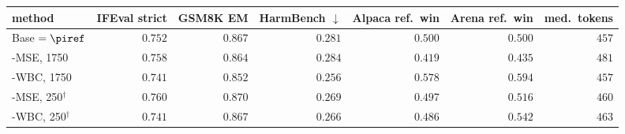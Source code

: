 \begin{tabular}{lrrrrrr}
\toprule
method & IFEval strict & \textsc{GSM8K} EM & HarmBench $\downarrow$ & Alpaca ref.\ win & Arena ref.\ win & med.\ tokens\\
\midrule
Base $=\piref$ & $0.752$ & $0.867$ & $0.281$ & $0.500$ & $0.500$ & $457$\\
\NBPO{}-MSE, 1750 & $0.758$ & $0.864$ & $0.284$ & $0.419$ & $0.435$ & $481$\\
\NBPO{}-WBC, 1750 & $0.741$ & $0.852$ & $0.256$ & $0.578$ & $0.594$ & $457$\\
\NBPO{}-MSE, 250$^\dagger$ & $0.760$ & $0.870$ & $0.269$ & $0.497$ & $0.516$ & $460$\\
\NBPO{}-WBC, 250$^\dagger$ & $0.741$ & $0.867$ & $0.266$ & $0.486$ & $0.542$ & $463$\\
\bottomrule
\end{tabular}
